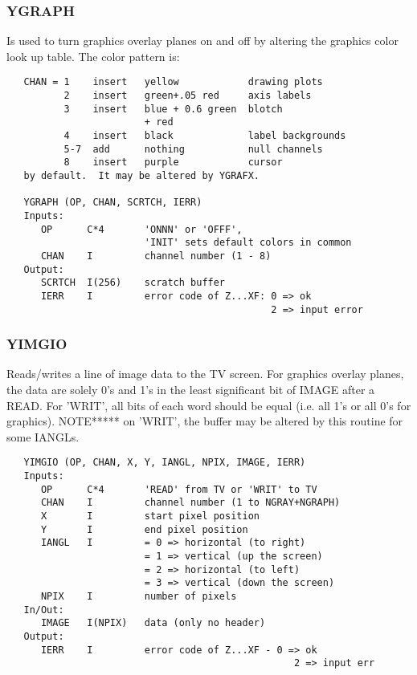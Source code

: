 \subsubsection{YGRAPH}
Is used to turn graphics overlay planes on and off by
altering the graphics color look up table.  The color pattern is:
\begin{verbatim}
   CHAN = 1    insert   yellow            drawing plots
          2    insert   green+.05 red     axis labels
          3    insert   blue + 0.6 green  blotch
                        + red
          4    insert   black             label backgrounds
          5-7  add      nothing           null channels
          8    insert   purple            cursor
   by default.  It may be altered by YGRAFX.

   YGRAPH (OP, CHAN, SCRTCH, IERR)
   Inputs:
      OP      C*4       'ONNN' or 'OFFF',
                        'INIT' sets default colors in common
      CHAN    I         channel number (1 - 8)
   Output:
      SCRTCH  I(256)    scratch buffer
      IERR    I         error code of Z...XF: 0 => ok
                                              2 => input error

\end{verbatim}

\subsubsection{YIMGIO}
Reads/writes a line of image data to the TV screen.  For
graphics overlay planes, the data are solely 0's and 1's in the
least significant bit of IMAGE after a READ.  For 'WRIT', all bits
of each word should be equal (i.e. all 1's or all 0's for graphics).
NOTE***** on 'WRIT', the buffer may be altered by this routine for
some IANGLs.
\begin{verbatim}
   YIMGIO (OP, CHAN, X, Y, IANGL, NPIX, IMAGE, IERR)
   Inputs:
      OP      C*4       'READ' from TV or 'WRIT' to TV
      CHAN    I         channel number (1 to NGRAY+NGRAPH)
      X       I         start pixel position
      Y       I         end pixel position
      IANGL   I         = 0 => horizontal (to right)
                        = 1 => vertical (up the screen)
                        = 2 => horizontal (to left)
                        = 3 => vertical (down the screen)
      NPIX    I         number of pixels
   In/Out:
      IMAGE   I(NPIX)   data (only no header)
   Output:
      IERR    I         error code of Z...XF - 0 => ok
                                                  2 => input err

\end{verbatim}

